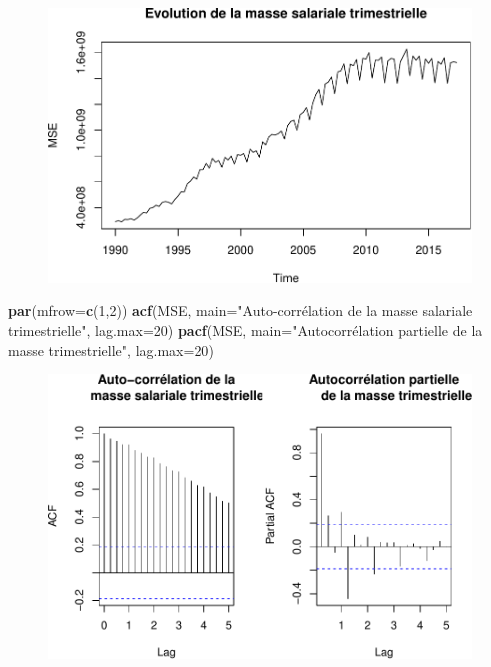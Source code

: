 \documentclass[11pt,]{article}
\newenvironment{Shaded}{\begin{snugshade}}{\end{snugshade}}
\newcommand{\KeywordTok}[1]{\textcolor[rgb]{0.13,0.29,0.53}{\textbf{{#1}}}}
\newcommand{\DataTypeTok}[1]{\textcolor[rgb]{0.13,0.29,0.53}{{#1}}}
\newcommand{\DecValTok}[1]{\textcolor[rgb]{0.00,0.00,0.81}{{#1}}}
\newcommand{\StringTok}[1]{\textcolor[rgb]{0.31,0.60,0.02}{{#1}}}
\newcommand{\NormalTok}[1]{{#1}}
\begin{document}
\begin{figure}[htbp]
\centering
\includegraphics{doc_files/figure-latex/unnamed-chunk-2-1.pdf}
\caption{\label{fig}}
\end{figure}

\begin{Shaded}
\begin{Highlighting}[]
  \KeywordTok{par}\NormalTok{(}\DataTypeTok{mfrow=}\KeywordTok{c}\NormalTok{(}\DecValTok{1}\NormalTok{,}\DecValTok{2}\NormalTok{))}
  \KeywordTok{acf}\NormalTok{(MSE, }\DataTypeTok{main=}\StringTok{"Auto-corrélation de la}
\StringTok{      masse salariale trimestrielle"}\NormalTok{, }\DataTypeTok{lag.max=}\DecValTok{20}\NormalTok{)}
  \KeywordTok{pacf}\NormalTok{(MSE, }\DataTypeTok{main=}\StringTok{"Autocorrélation partielle}
\StringTok{       de la masse trimestrielle"}\NormalTok{, }\DataTypeTok{lag.max=}\DecValTok{20}\NormalTok{)}
\end{Highlighting}
\end{Shaded}

\begin{figure}[htbp]
\centering
\includegraphics{doc_files/figure-latex/unnamed-chunk-2-2.pdf}
\caption{\label{fig}}
\end{figure}
\end{document}
